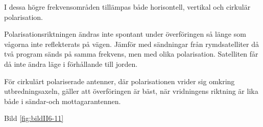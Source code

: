 I dessa högre frekvensområden tillämpas både horisontell, vertikal och
cirkulär polarisation.

Polarisationsriktningen ändras inte spontant under överföringen så
länge som vågorna inte reflekterats på vägen. Jämför med sändningar
från rymdsatelliter då två program sänds på samma frekvens, men med
olika polarisation. Satelliten får då inte ändra läge i förhållande
till jorden.

För cirkulärt polariserade antenner, där polarisationen vrider sig
omkring utbredningsaxeln, gäller att överföringen är bäst, när
vridningens riktning är lika både i sändar-och mottagarantennen.

Bild \ref{fig:bildII6-11}

